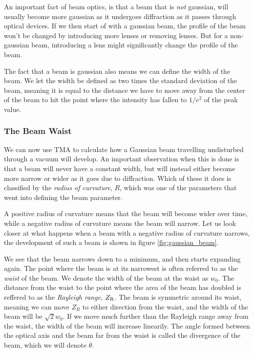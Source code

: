 \documentclass[a4paper, 11pt, notitlepage, english]{article}
\begin{document}
\clearpage

An important fact of beam optics, is that a beam that is \emph{not} gaussian, will usually become more gaussian as it undergoes diffraction as it passes through optical devices. If we then start of with a gaussian beam, the profile of the beam won't be changed by introducing more lenses or removing lenses. But for a non-gaussian beam, introducing a lens might significantly change the profile of the beam.

The fact that a beam is gaussian also means we can define the width of the beam. We let the width be defined as two times the standard deviation of the beam, meaning it is equal to the distance we have to move away from the center of the beam to hit the point where the intensity has fallen to $1/e^2$ of the peak value.



\subsubsection{The Beam Waist}
We can now use TMA to calculate how a Gaussian beam travelling undisturbed through a vacuum will develop. An important observation when this is done is that a beam will never have a constant width, but will instead either become more narrow or wider as it goes due to diffraction. Which of these it does is classified by the \emph{radius of curvature}, $R$, which was one of the parameters that went into defining the beam parameter.

A positive radius of curvature means that the beam will become wider over time, while a negative radius of curvature means the beam will narrow. Let us look closer at what happens when a beam with a negative radius of curvature narrows, the development of such a beam is shown in figure \ref{fig:gaussian_beam}.

We see that the beam narrows down to a minimum, and then starts expanding again. The point where the beam is at its narrowest is often referred to as the \emph{waist} of the beam. We denote the width of the beam at the waist as $w_0$. The distance from the waist to the point where the area of the beam has doubled is reffered to as the \emph{Rayleigh range}, $Z_{\rm R}$. The beam is symmetric around its waist, meaning we can move $Z_R$ to either direction from the waist, and the width of the beam will be $\sqrt{2}w_0$. If we move much further than the Rayleigh range away from the waist, the width of the beam will increase linearily. The angle formed between the optical axis and the beam far from the waist is called the divergence of the beam, which we will denote $\theta$.
\end{document}
